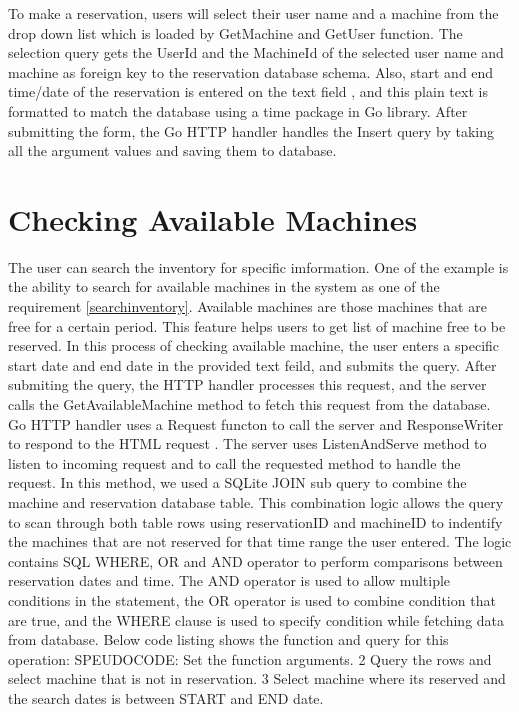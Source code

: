 To make a reservation, users will select their user name and a machine from the drop down list which is loaded by GetMachine and GetUser function. The selection query gets the UserId and the MachineId of the selected user name and machine as foreign key to the reservation database schema. Also, start and end time/date of the reservation is entered on the text field , and this plain text is formatted to match the database using a time package in Go library. After submitting the form, the Go HTTP handler handles the Insert query by taking all the argument values and saving them to database. 
\section*{Checking Available Machines}
The user can search the inventory for specific imformation. One of the example is the ability to search for available machines in the system as one of the requirement \ref{searchinventory}. Available machines are those machines that are free for a certain period. This feature helps users to get list of machine free to be reserved. In this process of checking available machine, the user enters a specific start date and end date in the provided text feild, and submits the query. After submiting the query, the HTTP handler processes this request, and the server calls the GetAvailableMachine method to fetch this request from the database. Go HTTP handler uses a Request functon to call the server and  ResponseWriter to respond to the HTML request \cite{Gohttp}. The server uses ListenAndServe method to listen to incoming request and to call the requested method to handle the request. In this method, we used a SQLite JOIN sub query to combine the machine and reservation database table. This combination logic allows the query to scan through both table rows using reservationID and machineID to indentify the machines that are not reserved for that time range the user entered. The logic contains SQL WHERE, OR and AND operator to perform comparisons between reservation dates and time. \cite{ANDOR}The AND operator is used to allow multiple conditions in the statement,  the OR operator is used to combine condition that are true, and the WHERE clause is used to specify condition while fetching data from database\cite{WHEREclause}. 
\pagebreak
Below code listing shows the function and query for this operation:
SPEUDOCODE: Set the function arguments.
2 Query the rows and select machine that is not in reservation.
3 Select machine where its reserved and the search dates is between  START and END date. 
